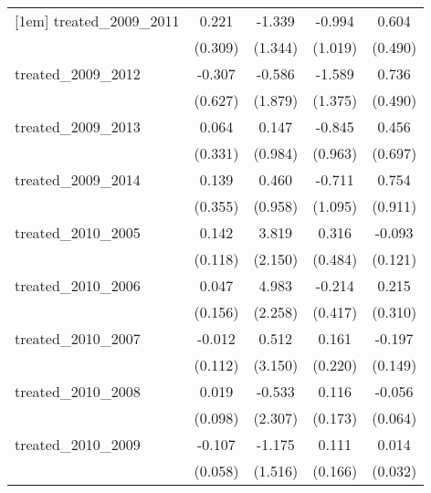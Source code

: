 {\begin{tabular}{l*{4}{c}}
[1em]
treated\_2009\_2011&       0.221         &      -1.339         &      -0.994         &       0.604         \\
            &     (0.309)         &     (1.344)         &     (1.019)         &     (0.490)         \\
[1em]
treated\_2009\_2012&      -0.307         &      -0.586         &      -1.589         &       0.736         \\
            &     (0.627)         &     (1.879)         &     (1.375)         &     (0.490)         \\
[1em]
treated\_2009\_2013&       0.064         &       0.147         &      -0.845         &       0.456         \\
            &     (0.331)         &     (0.984)         &     (0.963)         &     (0.697)         \\
[1em]
treated\_2009\_2014&       0.139         &       0.460         &      -0.711         &       0.754         \\
            &     (0.355)         &     (0.958)         &     (1.095)         &     (0.911)         \\
[1em]
treated\_2010\_2005&       0.142         &       3.819         &       0.316         &      -0.093         \\
            &     (0.118)         &     (2.150)         &     (0.484)         &     (0.121)         \\
[1em]
treated\_2010\_2006&       0.047         &       4.983\sym{*}  &      -0.214         &       0.215         \\
            &     (0.156)         &     (2.258)         &     (0.417)         &     (0.310)         \\
[1em]
treated\_2010\_2007&      -0.012         &       0.512         &       0.161         &      -0.197         \\
            &     (0.112)         &     (3.150)         &     (0.220)         &     (0.149)         \\
[1em]
treated\_2010\_2008&       0.019         &      -0.533         &       0.116         &      -0.056         \\
            &     (0.098)         &     (2.307)         &     (0.173)         &     (0.064)         \\
[1em]
treated\_2010\_2009&      -0.107         &      -1.175         &       0.111         &       0.014         \\
            &     (0.058)         &     (1.516)         &     (0.166)         &     (0.032)         \\

\end{tabular}}
